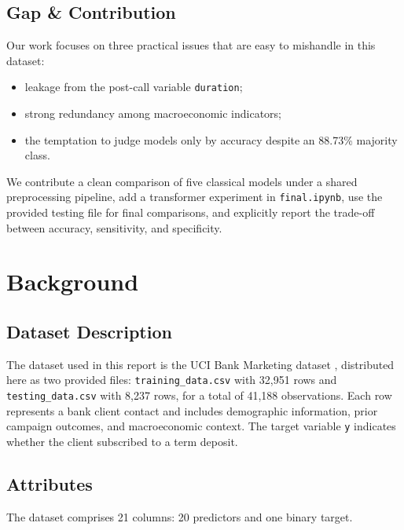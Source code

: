 \documentclass[10pt,twocolumn]{article}
\begin{document}
\subsection{Gap \& Contribution}
Our work focuses on three practical issues that are easy to mishandle in this dataset:
\begin{itemize}
  \item leakage from the post-call variable \texttt{duration};
  \item strong redundancy among macroeconomic indicators;
  \item the temptation to judge models only by accuracy despite an 88.73\% majority class.
\end{itemize}
We contribute a clean comparison of five classical models under a shared preprocessing pipeline, add a transformer experiment in \texttt{final.ipynb}, use the provided testing file for final comparisons, and explicitly report the trade-off between accuracy, sensitivity, and specificity.

\section{Background}

\subsection{Dataset Description}
The dataset used in this report is the UCI Bank Marketing dataset \cite{moro2014}, distributed here as two provided files: \texttt{training\_data.csv} with 32{,}951 rows and \texttt{testing\_data.csv} with 8{,}237 rows, for a total of 41{,}188 observations. Each row represents a bank client contact and includes demographic information, prior campaign outcomes, and macroeconomic context. The target variable \texttt{y} indicates whether the client subscribed to a term deposit.

\subsection{Attributes}
The dataset comprises 21 columns: 20 predictors and one binary target.
\end{document}
